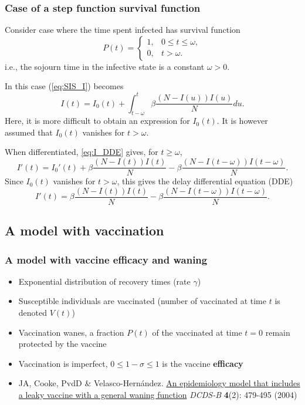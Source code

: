 \documentclass[aspectratio=43]{beamer}
\begin{document}
\begin{frame}\frametitle{Case of a step function survival function}
Consider case where the time spent infected has survival function 
\[
P(t)=\begin{cases}
1, & 0\leq t\leq\omega,\\
0, & t>\omega.
\end{cases}
\]
i.e., the sojourn time in the infective state is a constant
$\omega>0$.
 
In this case (\ref{eq:SIS_I}) becomes
\begin{equation}\label{eq:I_DDE}
I(t)=I_0(t)+\int_{t-\omega}^t \beta\frac{(N-I(u))I(u)}{N} du.
\end{equation}
Here, it is more difficult to obtain an expression for $I_0(t)$. It is however
assumed that $I_0(t)$ vanishes for $t>\omega$.
\end{frame}

\begin{frame}
When differentiated, \eqref{eq:I_DDE} gives, for $t\geq\omega$,
\[
I'(t)=I_0'(t)+\beta\frac{(N-I(t))I(t)}{N}
-\beta\frac{\left(N-I(t-\omega)\right)I(t-\omega)}{N}.
\]
Since $I_0(t)$ vanishes for $t>\omega$, this gives the delay
differential equation (DDE)
\[
I'(t)=\beta\frac{(N-I(t))I(t)}{N}
-\beta\frac{(N-I(t-\omega))I(t-\omega)}{N}.
\]
\end{frame}




\subsection{A model with vaccination}

\begin{frame}\frametitle{A model with vaccine efficacy and waning}
\begin{itemize}
\item Exponential distribution of recovery times (rate $\gamma$)
\vfill
\item Susceptible individuals are vaccinated (number of vaccinated at time $t$ is denoted $V(t)$)
\vfill
\item Vaccination wanes, a fraction $P(t)$ of the vaccinated at time $t=0$ remain protected by the vaccine
\vfill
\item Vaccination is imperfect, $0\leq 1-\sigma\leq 1$ is the vaccine \textbf{efficacy}
\end{itemize}
\vfill
{\tiny
\begin{itemize}
\setlength{\itemsep}{-5pt}
\item JA, Cooke, PvdD \& Velasco-Hernández. \href{https://julien-arino.github.io/assets/pdf/papers/2004_ArinoCookeVelascoPvdD-DCDSB4.pdf}{An epidemiology model that includes a leaky vaccine with a general waning function} \emph{DCDS-B} \textbf{4}(2): 479-495 (2004)
\end{itemize}}
\end{frame}
\end{document}
